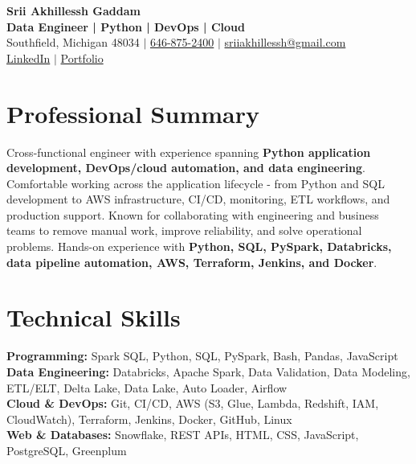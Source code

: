 \documentclass[letterpaper,10pt]{article}
\begin{document}
\fontsize{9.35pt}{10.45pt}\selectfont

\begin{center}
    {\LARGE \textbf{Srii Akhillessh Gaddam}} \\[-1pt]
    \textbf{Data Engineer | Python | DevOps | Cloud} \\[2pt]
    Southfield, Michigan 48034 $|$
    \href{tel:6468752400}{646-875-2400} $|$
    \href{mailto:sriiakhillessh@gmail.com}{sriiakhillessh@gmail.com} \\[1pt]
    \href{https://www.linkedin.com/in/srii-akhiilessh-gaddam-b48668191/}{LinkedIn} $|$
    \href{https://sriiakhillesshg.github.io/portfolio/}{Portfolio}
\end{center}
\vspace{-8pt}

\section{Professional Summary}
\small{Cross-functional engineer with experience spanning \textbf{Python application development, DevOps/cloud automation, and data engineering}. Comfortable working across the application lifecycle - from Python and SQL development to AWS infrastructure, CI/CD, monitoring, ETL workflows, and production support. Known for collaborating with engineering and business teams to remove manual work, improve reliability, and solve operational problems. Hands-on experience with \textbf{Python, SQL, PySpark, Databricks, data pipeline automation, AWS, Terraform, Jenkins, and Docker}.}

\section{Technical Skills}
\small{
\textbf{Programming:} Spark SQL, Python, SQL, PySpark, Bash, Pandas, JavaScript \\
\textbf{Data Engineering:} Databricks, Apache Spark, Data Validation, Data Modeling, ETL/ELT, Delta Lake, Data Lake, Auto Loader, Airflow \\
\textbf{Cloud \& DevOps:} Git, CI/CD, AWS (S3, Glue, Lambda, Redshift, IAM, CloudWatch), Terraform, Jenkins, Docker, GitHub, Linux \\
\textbf{Web \& Databases:} Snowflake, REST APIs, HTML, CSS, JavaScript, PostgreSQL, Greenplum
}
\end{document}
